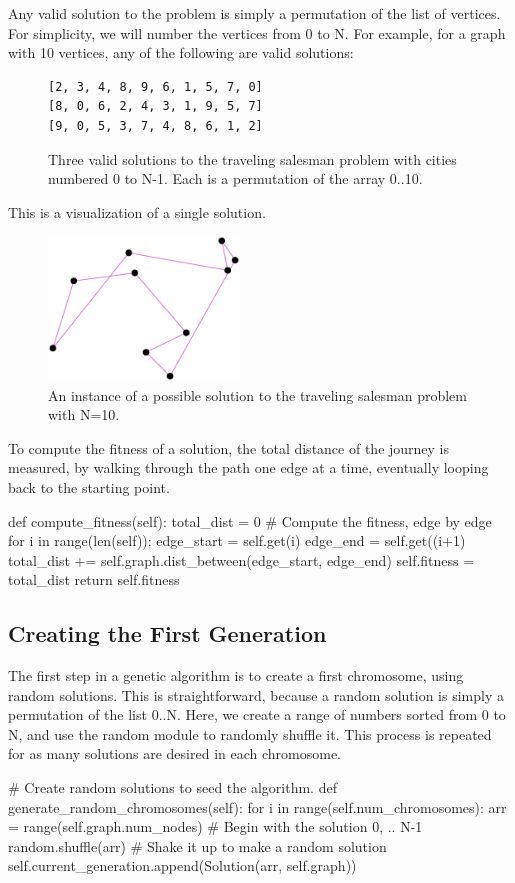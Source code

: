 Any valid solution to the problem is simply a permutation of the list of vertices. For simplicity, we will number the vertices from 0 to N. For example, for a graph with 10 vertices, any of the following are valid solutions:

\begin{figure}[h!]
\begin{verbatim}
[2, 3, 4, 8, 9, 6, 1, 5, 7, 0]
[8, 0, 6, 2, 4, 3, 1, 9, 5, 7]
[9, 0, 5, 3, 7, 4, 8, 6, 1, 2]
\end{verbatim}
\caption{Three valid solutions to the traveling salesman problem with cities numbered 0 to N-1. Each is a permutation of the array 0..10.}
\end{figure}

This is a visualization of a single solution.

\begin{figure}[h!]
\centering
\includegraphics[width=2in]{images/single_solution.eps}
\caption{An instance of a possible solution to the traveling salesman problem with N=10.}
\end{figure}

To compute the fitness of a solution, the total distance of the journey is measured, by walking through the path one edge at a time, eventually looping back to the starting point.

\begin{python}
def compute_fitness(self):
  total_dist = 0
  # Compute the fitness, edge by edge
  for i in range(len(self)):
    edge_start = self.get(i)
    edge_end = self.get((i+1)%
    total_dist += self.graph.dist_between(edge_start, edge_end)
  self.fitness = total_dist
  return self.fitness
\end{python}

\subsection{Creating the First Generation}

The first step in a genetic algorithm is to create a first chromosome, using random solutions. This is straightforward, because a random solution is simply a permutation of the list 0..N. Here, we create a range of numbers sorted from 0 to N, and use the random module to randomly shuffle it. This process is repeated for as many solutions are desired in each chromosome.
\begin{python}
# Create random solutions to seed the algorithm.
def generate_random_chromosomes(self):
  for i in range(self.num_chromosomes):
    arr = range(self.graph.num_nodes)  # Begin with the solution 0, .. N-1
    random.shuffle(arr)         # Shake it up to make a random solution
    self.current_generation.append(Solution(arr, self.graph))
\end{python}
 	
